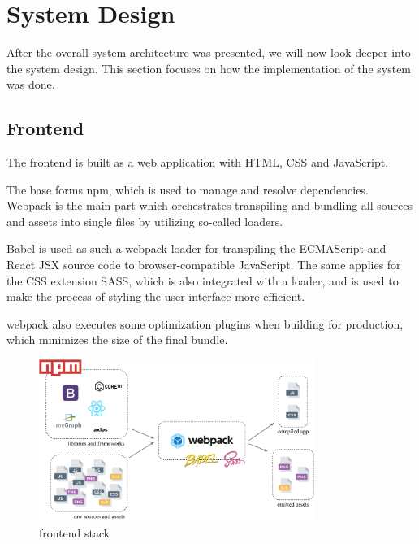\documentclass[a4paper,top=25mm,bottom=25mm,12pt,pdftex,halfparskip,twoside,bibtotoc,numbers=noenddot]{scrbook}
\begin{document}

\section{System Design}

After the overall system architecture was presented, we will now look deeper into the system design.
This  section  focuses on how the implementation of the system was done.

\subsection{Frontend}
The frontend is built as a web application with HTML, CSS and JavaScript.

The base forms npm, which is used to manage and resolve dependencies.  Webpack is the main part which orchestrates transpiling and bundling all sources and assets into single files by utilizing so-called loaders.

Babel is used as such a webpack loader for transpiling the ECMAScript and React JSX source code to browser-compatible JavaScript.
The same applies for the CSS extension SASS, which is also integrated with a loader, and is used to make the process of styling the user interface more efficient.

webpack also executes some optimization plugins when building for production, which minimizes the size of the final bundle.

\begin{figure}[H]
  \centering
  \vspace{0.8cm}
  \includegraphics[width=0.8\textwidth]{frontend-setup}
  \caption{frontend stack}
\end{figure}
\end{document}
